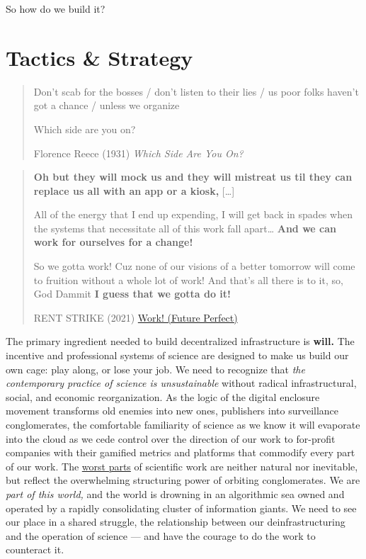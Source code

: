 So how do we build it?

\hypertarget{tactics-strategy}{%
\section{Tactics \& Strategy}\label{tactics-strategy}}

\begin{quote}
Don't scab for the bosses / don't listen to their lies / us poor folks
haven't got a chance / unless we organize

Which side are you on?

Florence Reece (1931) \emph{Which Side Are You On?}
\end{quote}

\begin{quote}
\textbf{Oh but they will mock us and they will mistreat us til they can
replace us all with an app or a kiosk,} {[}\ldots{]}

All of the energy that I end up expending, I will get back in spades
when the systems that necessitate all of this work fall apart\ldots{}
\textbf{And we can work for ourselves for a change!}

So we gotta work! Cuz none of our visions of a better tomorrow will come
to fruition without a whole lot of work! And that's all there is to it,
so, God Dammit \textbf{I guess that we gotta do it!}

RENT STRIKE (2021)
\href{https://rentstrike.bandcamp.com/track/work-future-perfect-2}{Work!
(Future Perfect)} \citep{rentstrikeWorkFuturePerfect2021} 
\end{quote}

The primary ingredient needed to build decentralized infrastructure is
\textbf{will.} The incentive and professional systems of science are
designed to make us build our own cage: play along, or lose your job. We
need to recognize that \emph{the contemporary practice of science is
unsustainable} without radical infrastructural, social, and economic
reorganization. As the logic of the digital enclosure movement
transforms old enemies into new ones, publishers into surveillance
conglomerates, the comfortable familiarity of science as we know it will
evaporate into the cloud as we cede control over the direction of our
work to for-profit companies with their gamified metrics and platforms
that commodify every part of our work. The
\protect\hyperlink{the-state-of-things}{worst parts} of scientific work
are neither natural nor inevitable, but reflect the overwhelming
structuring power of orbiting conglomerates. We are \emph{part of this
world,} and the world is drowning in an algorithmic sea owned and
operated by a rapidly consolidating cluster of information giants. We
need to see our place in a shared struggle, the relationship between our
deinfrastructuring and the operation of science --- and have the courage
to do the work to counteract it.

